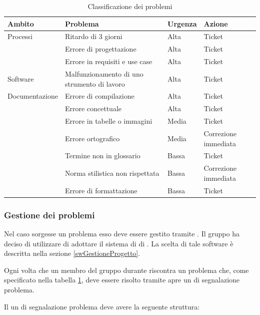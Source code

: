 \documentclass[12pt,a4paper]{article}
\begin{document}
\begin{table}[H]
	\begin{tabular}{p{} p{} p{} p{}}
		\toprule
		\textbf{Ambito}	&	\textbf{Problema}	&	\textbf{Urgenza}	&	\textbf{Azione}\\
		\midrule
		\midrule
		Processi & Ritardo di 3 giorni & Alta & Ticket \\
		\midrule
		& Errore di progettazione & Alta & Ticket \\
		\midrule
		& Errore in requisiti e use case & Alta & Ticket \\
		\midrule
		\midrule
		Software & Malfunzionamento di uno strumento di lavoro & Alta & Ticket \\
		\midrule
		\midrule
		Documentazione & Errore di compilazione & Alta & Ticket \\
		\midrule
		& Errore concettuale & Alta & Ticket \\
		\midrule
		& Errore in tabelle o immagini & Media & Ticket \\
		\midrule
		& Errore ortografico & Media & Correzione immediata \\
		\midrule
		& Termine non in glossario & Bassa & Ticket \\
		\midrule
		& Norma stilistica non rispettata & Bassa & Correzione immediata \\
		\midrule
		& Errore di formattazione & Bassa & Ticket \\
		\bottomrule
	\end{tabular}
	\caption{Classificazione dei problemi}
	\label{tabCalssificazioneProb}
\end{table}

\subsubsection{Gestione dei problemi}
Nel caso sorgesse un problema esso deve essere gestito tramite . Il gruppo ha deciso di utilizzare  di adottare il sistema di  di . La scelta di tale software è descritta nella sezione \ref{swGestioneProgetto}.

Ogni volta che un membro del gruppo durante riscontra un problema che, come specificato nella tabella \ref{tabCalssificazioneProb}, deve essere risolto tramite  apre un  di segnalazione problema.

\label{ticketProblema}
Il un  di segnalazione problema deve avere la seguente struttura:
\end{document}
